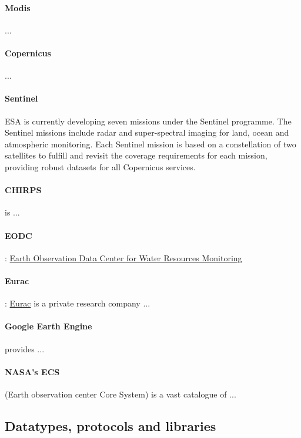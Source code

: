 \paragraph{Modis} ...

\paragraph{Copernicus} ...

\paragraph{Sentinel} ESA is currently developing seven missions under the Sentinel programme. The Sentinel missions include radar and super-spectral imaging for land, ocean and atmospheric monitoring. Each Sentinel mission is based on a constellation of two satellites to fulfill and revisit the coverage requirements for each mission, providing robust datasets for all Copernicus services.

\paragraph{CHIRPS} is ...

\paragraph{EODC}: \href{https://www.eodc.eu/}{Earth Observation Data Center for Water Resources Monitoring}

\paragraph{Eurac}: \href{http://www.eurac.edu}{Eurac} is a private research company ...

\paragraph{Google Earth Engine} provides ...

\paragraph{NASA's ECS} (Earth observation center Core System) is a vast catalogue of ...



\subsection{Datatypes, protocols and libraries}

